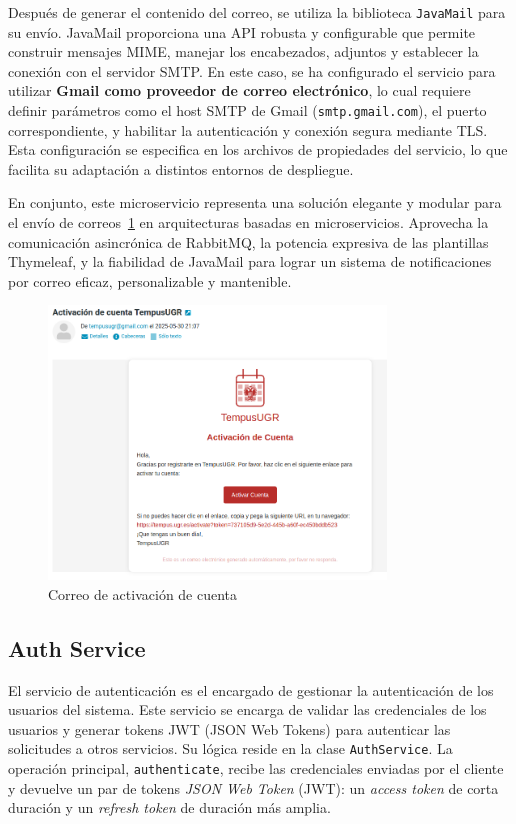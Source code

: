 Después de generar el contenido del correo, se utiliza la biblioteca \texttt{JavaMail} para su envío. JavaMail proporciona una API robusta y configurable que permite construir mensajes MIME, manejar los encabezados, adjuntos y establecer la conexión con el servidor SMTP. En este caso, se ha configurado el servicio para utilizar \textbf{Gmail como proveedor de correo electrónico}, lo cual requiere definir parámetros como el host SMTP de Gmail (\texttt{smtp.gmail.com}), el puerto correspondiente, y habilitar la autenticación y conexión segura mediante TLS. Esta configuración se especifica en los archivos de propiedades del servicio, lo que facilita su adaptación a distintos entornos de despliegue.

En conjunto, este microservicio representa una solución elegante y modular para el envío de correos~\ref{fig:mail-service-class-diagram} en arquitecturas basadas en microservicios. Aprovecha la comunicación asincrónica de RabbitMQ, la potencia expresiva de las plantillas Thymeleaf, y la fiabilidad de JavaMail para lograr un sistema de notificaciones por correo eficaz, personalizable y mantenible.

\begin{figure}[H]
    \centering
    \includegraphics[width=0.8\textwidth]{figures/07_email.png}
    \caption{Correo de activación de cuenta}
    \label{fig:mail-service-class-diagram}
\end{figure}

\subsection{Auth Service}
El servicio de autenticación es el encargado de gestionar la autenticación de los usuarios del sistema. Este servicio se encarga de validar las credenciales de los usuarios y generar tokens JWT (JSON Web Tokens) para autenticar las solicitudes a otros servicios.
\newline\newline
Su lógica reside en la clase \texttt{AuthService}. 
La operación principal, \texttt{authenticate}, recibe las credenciales enviadas por el cliente y devuelve un par de tokens
\emph{JSON Web Token} (JWT): un \emph{access token} de corta duración y un \emph{refresh token} de duración más amplia. 


